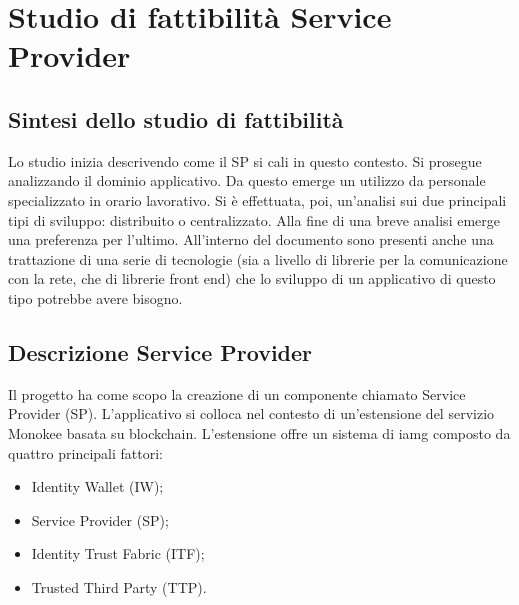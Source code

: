 \section{Studio di fattibilità Service Provider}
\subsection{Sintesi dello studio di fattibilità}
Lo studio inizia descrivendo come il SP si cali in questo contesto. Si prosegue analizzando il dominio applicativo. Da questo emerge un utilizzo da personale specializzato in orario lavorativo. Si è effettuata, poi, un’analisi sui due principali tipi di sviluppo: distribuito o centralizzato. Alla fine di una breve analisi emerge una preferenza per l’ultimo. All’interno del documento sono presenti anche una trattazione di una serie di tecnologie (sia a livello di librerie per la comunicazione con la rete, che di librerie front end) che lo sviluppo di un applicativo di questo tipo potrebbe avere bisogno. 
\subsection{Descrizione Service Provider}
Il progetto ha come scopo la creazione di un componente chiamato Service Provider (SP). L’applicativo si colloca nel contesto di un’estensione del servizio Monokee basata su blockchain. L’estensione offre un sistema di \gls{iamg} composto da quattro principali fattori: 
\begin{itemize}
    \item Identity Wallet (IW);
    \item Service Provider (SP); 
    \item Identity Trust Fabric (ITF); 
    \item Trusted Third Party (TTP).
\end{itemize}
    

